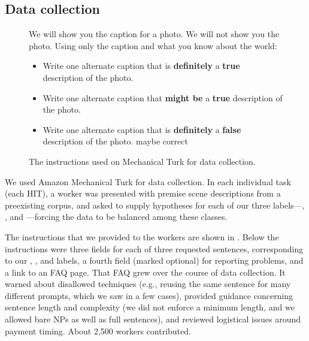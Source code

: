 
\subsection{Data collection}

\begin{figure}
\begin{framed}
\small
We will show you the caption for a photo. We will not show you the photo. Using only the caption and what you know about the world:
\begin{itemize}
\item Write one alternate caption that is \textbf{definitely} a \textbf{true} description of the photo. 
\item Write one alternate caption that \textbf{might be} a \textbf{true} description of the photo. 
\item Write one alternate caption that is \textbf{definitely} a \textbf{false} description of the photo.  maybe correct 
\end{itemize}
\end{framed}

\caption{\label{instructions-1}The instructions used on Mechanical Turk for data collection.}
\end{figure}

We used Amazon Mechanical Turk for data collection. In each individual task (each HIT), a worker was presented with premise scene descriptions from a preexisting corpus, and asked to supply hypotheses for each of our three labels---, , and ---forcing the data to be balanced among these classes.

The instructions that we provided to the workers are shown in . Below the instructions were three fields for each of three requested sentences, corresponding to our , , and  labels, a fourth field (marked optional) for reporting problems, and a link to an FAQ page. That FAQ grew over the course of data collection. It warned about disallowed techniques (e.g., reusing the same sentence for many different prompts, which we saw in a few cases), provided guidance concerning sentence length and complexity (we did not enforce a minimum length, and we allowed bare NPs as well as full sentences), and reviewed logistical issues around payment timing. About 2,500 workers contributed.

